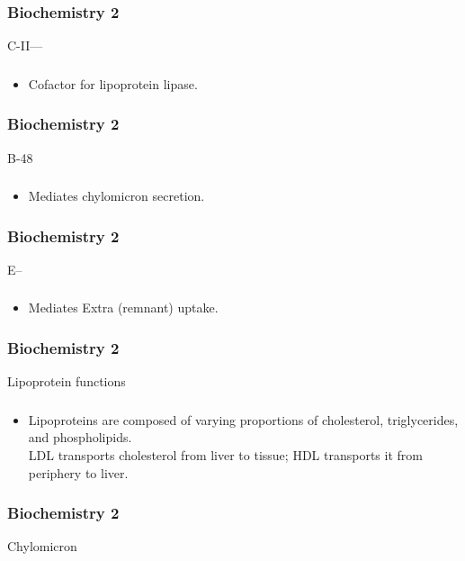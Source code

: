 \documentclass[11pt]{beamer}
\begin{document}
\begin{frame}
 \frametitle{Biochemistry 2}
C-II––
\end{frame}

\begin{frame}
 \frametitle{}
\begin{itemize}
\item Cofactor for lipoprotein lipase.
\end{itemize}
\end{frame}

\begin{frame}
 \frametitle{Biochemistry 2}
B-48
\end{frame}

\begin{frame}
 \frametitle{}
\begin{itemize}
\item Mediates chylomicron secretion.
\end{itemize}
\end{frame}

\begin{frame}
 \frametitle{Biochemistry 2}
E–
\end{frame}

\begin{frame}
 \frametitle{}
\begin{itemize}
\item Mediates Extra (remnant) uptake.
\end{itemize}
\end{frame}

\begin{frame}
 \frametitle{Biochemistry 2}
Lipoprotein functions
\end{frame}

\begin{frame}
 \frametitle{}
\begin{itemize}
\item Lipoproteins are composed of varying proportions of cholesterol, triglycerides, and phospholipids. \\ LDL transports cholesterol from liver to tissue; HDL transports it from periphery to liver.
\end{itemize}
\end{frame}

\begin{frame}
 \frametitle{Biochemistry 2}
Chylomicron
\end{frame}
\end{document}
